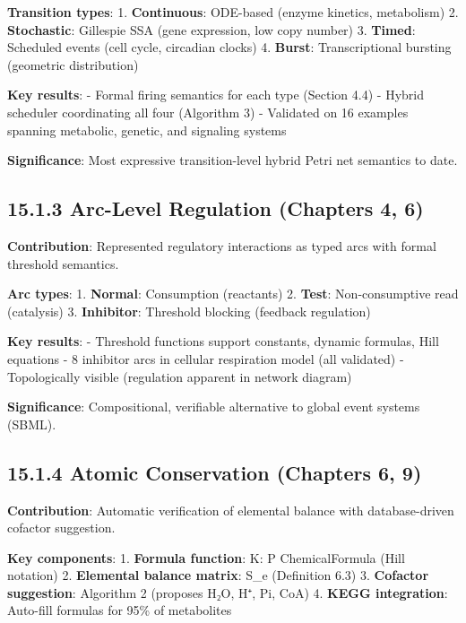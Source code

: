\textbf{Transition types}: 1. \textbf{Continuous}: ODE-based (enzyme
kinetics, metabolism) 2. \textbf{Stochastic}: Gillespie SSA (gene
expression, low copy number) 3. \textbf{Timed}: Scheduled events (cell
cycle, circadian clocks) 4. \textbf{Burst}: Transcriptional bursting
(geometric distribution)

\textbf{Key results}: - Formal firing semantics for each type (Section
4.4) - Hybrid scheduler coordinating all four (Algorithm 3) - Validated
on 16 examples spanning metabolic, genetic, and signaling systems

\textbf{Significance}: Most expressive transition-level hybrid Petri net
semantics to date.

\hypertarget{arc-level-regulation-chapters-4-6}{%
\subsection{15.1.3 Arc-Level Regulation (Chapters 4,
6)}\label{arc-level-regulation-chapters-4-6}}

\textbf{Contribution}: Represented regulatory interactions as typed arcs
with formal threshold semantics.

\textbf{Arc types}: 1. \textbf{Normal}: Consumption (reactants) 2.
\textbf{Test}: Non-consumptive read (catalysis) 3. \textbf{Inhibitor}:
Threshold blocking (feedback regulation)

\textbf{Key results}: - Threshold functions support constants, dynamic
formulas, Hill equations - 8 inhibitor arcs in cellular respiration
model (all validated) - Topologically visible (regulation apparent in
network diagram)

\textbf{Significance}: Compositional, verifiable alternative to global
event systems (SBML).

\hypertarget{atomic-conservation-chapters-6-9}{%
\subsection{15.1.4 Atomic Conservation (Chapters 6,
9)}\label{atomic-conservation-chapters-6-9}}

\textbf{Contribution}: Automatic verification of elemental balance with
database-driven cofactor suggestion.

\textbf{Key components}: 1. \textbf{Formula function}: K: P \textrightarrow
ChemicalFormula (Hill notation) 2. \textbf{Elemental balance matrix}:
S\_e (Definition 6.3) 3. \textbf{Cofactor suggestion}: Algorithm 2
(proposes H₂O, H⁺, Pi, CoA) 4. \textbf{KEGG integration}: Auto-fill
formulas for 95\% of metabolites

